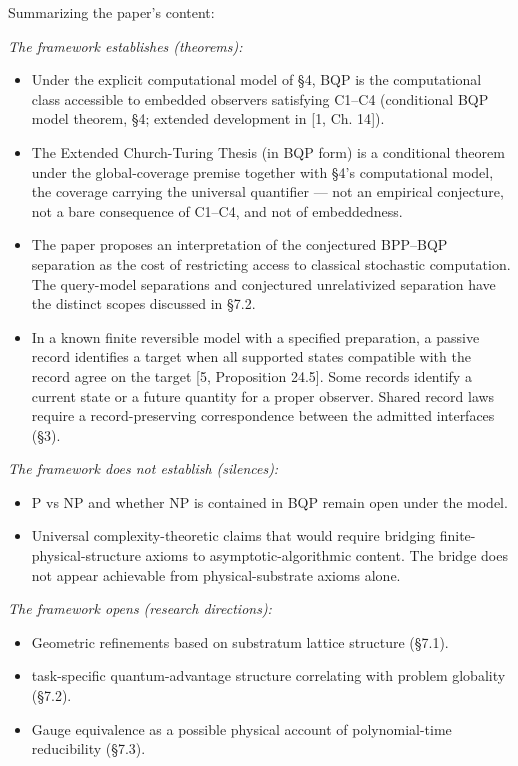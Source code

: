 \documentclass[
]{article}
\providecommand{\tightlist}{%
  \setlength{\itemsep}{0pt}\setlength{\parskip}{0pt}}
\begin{document}
Summarizing the paper's content:

\emph{The framework establishes (theorems):}

\begin{itemize}
\tightlist
\item
  Under the explicit computational model of §4, BQP is the computational
  class accessible to embedded observers satisfying C1--C4 (conditional
  BQP model theorem, §4; extended development in {[}1, Ch. 14{]}).
\item
  The Extended Church-Turing Thesis (in BQP form) is a conditional
  theorem under the global-coverage premise together with §4's
  computational model, the coverage carrying the universal quantifier
  --- not an empirical conjecture, not a bare consequence of C1--C4, and
  not of embeddedness.
\item
  The paper proposes an interpretation of the conjectured BPP--BQP
  separation as the cost of restricting access to classical stochastic
  computation. The query-model separations and conjectured unrelativized
  separation have the distinct scopes discussed in §7.2.
\item
  In a known finite reversible model with a specified preparation, a
  passive record identifies a target when all supported states
  compatible with the record agree on the target {[}5, Proposition
  24.5{]}. Some records identify a current state or a future quantity
  for a proper observer. Shared record laws require a record-preserving
  correspondence between the admitted interfaces (§3).
\end{itemize}

\emph{The framework does not establish (silences):}

\begin{itemize}
\tightlist
\item
  P vs NP and whether NP is contained in BQP remain open under the
  model.
\item
  Universal complexity-theoretic claims that would require bridging
  finite-physical-structure axioms to asymptotic-algorithmic content.
  The bridge does not appear achievable from physical-substrate axioms
  alone.
\end{itemize}

\emph{The framework opens (research directions):}

\begin{itemize}
\tightlist
\item
  Geometric refinements based on substratum lattice structure (§7.1).
\item
  task-specific quantum-advantage structure correlating with problem
  globality (§7.2).
\item
  Gauge equivalence as a possible physical account of polynomial-time
  reducibility (§7.3).
\end{itemize}
\end{document}
